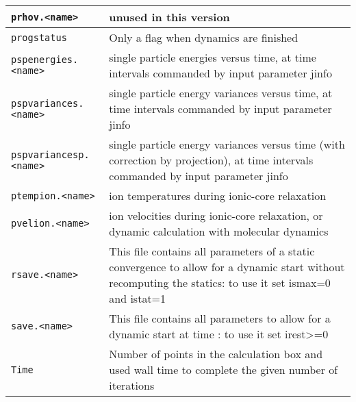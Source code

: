 \documentclass[11pt]{article}
\begin{document}
\begin{tabular}{|p{4.5cm}|p{10.2cm}|}
	\hline
	\texttt{prhov.<name>} & unused in this version\\
	\hline
	\texttt{progstatus} & Only a flag when dynamics are finished\\
	\hline
	\texttt{pspenergies.<name>} & single particle energies versus time, at time intervals commanded by input parameter jinfo\\
	\hline
	\texttt{pspvariances.<name>} & single particle energy variances versus time, at time intervals commanded by input parameter jinfo\\
	\hline
	\texttt{pspvariancesp.<name>} & single particle energy variances versus time (with correction by projection), at time intervals commanded by input parameter jinfo \\
	\hline
	\texttt{ptempion.<name>} & ion temperatures during ionic-core relaxation\\
	\hline
	\texttt{pvelion.<name>} & ion velocities during ionic-core relaxation, or dynamic calculation with molecular dynamics\\
	\hline
	\texttt{rsave.<name>} & This file contains all parameters of a static convergence to allow for a dynamic start without recomputing the statics: to use it set ismax=0 and istat=1  \\
	\hline
	\texttt{save.<name>} & This file contains all parameters to allow for a dynamic start at time : to use it set  irest>=0 \\
	\hline
	\texttt{Time} & Number of points in the calculation box and used wall time to complete the given number of iterations\\
	\hline
\end{tabular}
\end{document}
